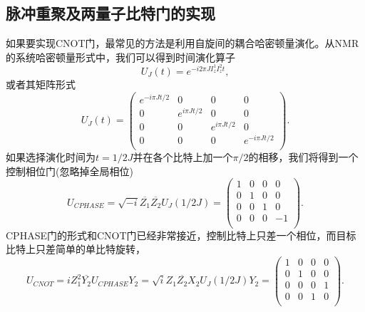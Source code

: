 \subsection{脉冲重聚及两量子比特门的实现}

如果要实现CNOT门，最常见的方法是利用自旋间的耦合哈密顿量演化。从NMR的系统哈密顿量形式中，我们可以得到时间演化算子
\begin{equation}\label{aaa}
U_J(t) = e^{-i2\pi JI_z^1I_z^2t},
\end{equation}
或者其矩阵形式
\begin{equation}\label{aaa}
U_J(t) = \left(
           \begin{array}{cccc}
             e^{-i\pi J t/2} & 0 & 0 & 0 \\
             0 & e^{i\pi J t/2} & 0 & 0 \\
            0 & 0 & e^{i\pi J t/2} & 0 \\
             0 & 0 & 0 & e^{-i\pi J t/2} \\
           \end{array}
         \right).
\end{equation}
如果选择演化时间为$t = 1/2J$并在各个比特上加一个$\pi/2$的相移，我们将得到一个控制相位门(忽略掉全局相位)
\begin{equation}\label{aaa}
U_{CPHASE} = \sqrt{-i}\overline{Z_1}\overline{Z_2}U_J(1/2J)=\left(
           \begin{array}{cccc}
             1 & 0 & 0 & 0 \\
             0 & 1 & 0 & 0 \\
            0 & 0 & 1 & 0 \\
             0 & 0 & 0 & -1 \\
           \end{array}
         \right).
\end{equation}
CPHASE门的形式和CNOT门已经非常接近，控制比特上只差一个相位，而目标比特上只差简单的单比特旋转，
\begin{equation}\label{ucnot}
U_{CNOT} = iZ_1^2\overline{Y_2}U_{CPHASE}Y_2 = \sqrt{i}Z_1\overline{Z_2}X_2U_J(1/2J)Y_2=\left(
           \begin{array}{cccc}
             1 & 0 & 0 & 0 \\
             0 & 1 & 0 & 0 \\
            0 & 0 & 0 & 1 \\
             0 & 0 & 1 & 0 \\
           \end{array}
         \right).
\end{equation}
